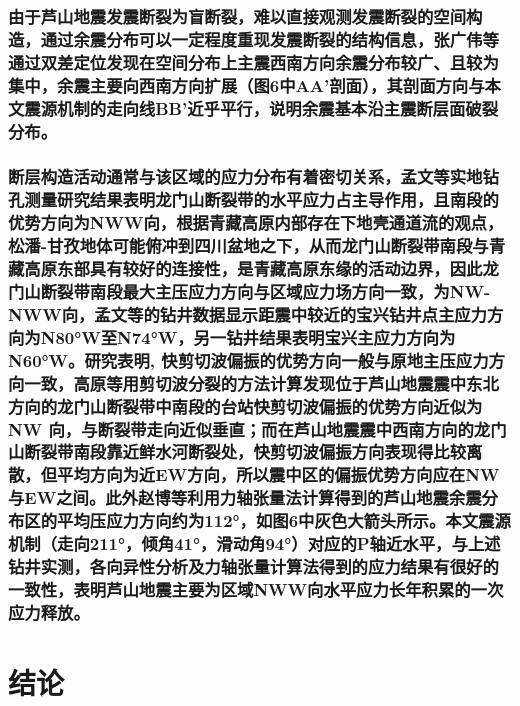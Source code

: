 \documentclass[a4paper,12pt,single,pdftex]{scrartcl}
\begin{document}
\label{ID_1585639519}\subsubsection{由于芦山地震发震断裂为盲断裂，难以直接观测发震断裂的空间构造，通过余震分布可以一定程度重现发震断裂的结构信息，张广伟等\cite{张广伟2013}通过双差定位发现在空间分布上主震西南方向余震分布较广、且较为集中，余震主要向西南方向扩展（图6中AA'剖面），其剖面方向与本文震源机制的走向线BB'近乎平行，说明余震基本沿主震断层面破裂分布。}

\label{ID_1845857375}\subsubsection{断层构造活动通常与该区域的应力分布有着密切关系，孟文等\cite{孟文2013}实地钻孔测量研究结果表明龙门山断裂带的水平应力占主导作用，且南段的优势方向为NWW向，根据青藏高原内部存在下地壳通道流的观点\cite{Royden1997,Clark2000,Meng2005,Burchfiel1995,Harris2007}，松潘-甘孜地体可能俯冲到四川盆地之下\cite{楼海2010}，从而龙门山断裂带南段与青藏高原东部具有较好的连接性，是青藏高原东缘的活动边界，因此龙门山断裂带南段最大主压应力方向与区域应力场方向一致，为NW-NWW向，孟文等的钻井数据显示距震中较近的宝兴钻井点主应力方向为N80°W至N74°W，另一钻井结果表明宝兴主应力方向为N60°W\cite{秦向辉2013}。研究表明, 快剪切波偏振的优势方向一般与原地主压应力方向一致\cite{高原2008,Gao2011,Gao2012}，高原等\cite{高原2013}用剪切波分裂的方法计算发现位于芦山地震震中东北方向的龙门山断裂带中南段的台站快剪切波偏振的优势方向近似为NW 向，与断裂带走向近似垂直；而在芦山地震震中西南方向的龙门山断裂带南段靠近鲜水河断裂处，快剪切波偏振方向表现得比较离散，但平均方向为近EW方向，所以震中区的偏振优势方向应在NW与EW之间。此外赵博等\cite{赵博2013}利用力轴张量法计算得到的芦山地震余震分布区的平均压应力方向约为112°，如图6中灰色大箭头所示。本文震源机制（走向211°，倾角41°，滑动角94°）对应的P轴近水平，与上述钻井实测，各向异性分析及力轴张量计算法得到的应力结果有很好的一致性，表明芦山地震主要为区域NWW向水平应力长年积累的一次应力释放。}

\label{ID_1085563922}\section{结论}


\newpage
\end{document}
